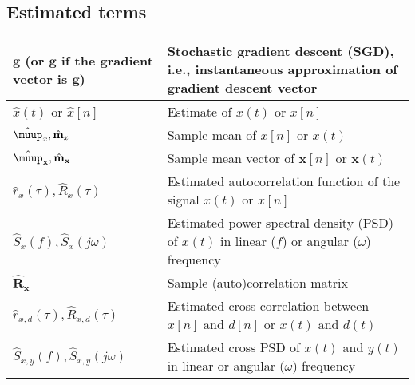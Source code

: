 \subsection{Estimated terms}
\begin{xltabular}{\textwidth}{XX}
	\(\mathbf{g}\) (or \(\hat{\mathbf{g}}\) if the gradient vector is \(\mathbf{g}\))                             & Stochastic gradient descent (SGD), i.e., instantaneous approximation of gradient descent vector            \\ \hline
	\(\hat{x}(t)\) or \(\hat{x}[n]\)                                                                              & Estimate of \(x(t)\) or \(x[n]\)                                                                           \\ \hline
	\(\hat{\boldsymbol{\muup}}_x, \hat{\mathbf{m}}_x\)                                                            & Sample mean of \(x[n]\) or \(x(t)\)                                                                        \\ \hline
	\(\hat{\boldsymbol{\muup}}_\mathbf{x}, \hat{\mathbf{m}}_\mathbf{x}\)                                          & Sample mean vector of \(\mathbf{x}[n]\) or \(\mathbf{x}(t)\)                                               \\ \hline
	\(\hat{r}_x(\tau), \hat{R}_x(\tau)\)                                                                          & Estimated autocorrelation function of the signal \(x(t)\) or \(x[n]\) \cite{nossekAdaptiveArraySignal2015} \\ \hline
	\(\hat{S}_x(f), \hat{S}_x(j\omega)\)                                                                          & Estimated power spectral density (PSD) of \(x(t)\) in linear (\(f\)) or angular (\(\omega\)) frequency     \\ \hline
	\(\hat{\mathbf{R}}_\mathbf{x}\)                                                                               & Sample (auto)correlation matrix                                                                            \\ \hline
	\(\hat{r}_{x,d}(\tau), \hat{R}_{x,d}(\tau)\)                                                                  & Estimated cross-correlation between \(x[n]\) and \(d[n]\) or \(x(t)\) and \(d(t)\)                         \\ \hline
	\(\hat{S}_{x,y}(f), \hat{S}_{x,y}(j\omega)\)                                                                  & Estimated cross PSD of \(x(t)\) and \(y(t)\) in linear or angular (\(\omega\)) frequency                   \\ \hline

\end{xltabular}

